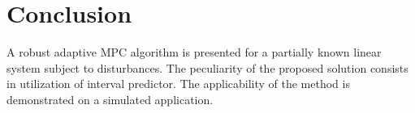 \documentclass[letterpaper, 10 pt, conference]{ieeeconf}  %
\begin{document}
\section*{Conclusion}

A robust adaptive MPC algorithm is presented for a partially known
linear system subject to disturbances. The peculiarity of the proposed
solution consists in utilization of interval predictor. The applicability
of the method is demonstrated on a simulated application.



\end{document}
